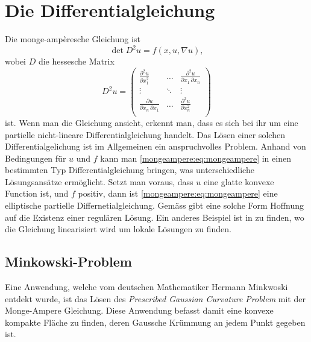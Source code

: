 %
%
%
%
\section{Die Differentialgleichung\label{mongeampere:section:teil0}}
Die monge-ampèresche Gleichung ist
\begin{equation}
  \det D^2 u = f(x, u, \nabla u),
  \label{mongeampere:eq:mongeampere}
\end{equation}
wobei $D$ die hessesche Matrix
\begin{equation}
  D^2 u =
  \begin{pmatrix}
    \frac{\partial^2 u}{\partial x_1^2} & \dots &\frac{\partial^2 u}{\partial x_1 \,\partial x_n} \\
  \vdots & \ddots & \vdots \\
  \frac{\partial u}{\partial x_n \,\partial x_1} & \dots &\frac{\partial^2 u}{\partial x_n^2} \\
  \end{pmatrix}
  \label{mongeampere:eq:hess}
\end{equation}
ist.
Wenn man die Gleichung ansieht, erkennt man, dass es sich bei ihr um eine partielle
nicht-lineare Differentialgleichung handelt.
Das Lösen einer solchen Differentialgelichung ist im Allgemeinen ein anspruchvolles Problem.
Anhand von Bedingungen für $u$ und $f$ kann man \eqref{mongeampere:eq:mongeampere} 
in einen bestimmten Typ Differentialgleichung bringen, was unterschiedliche Lösungsansätze ermöglicht.
Setzt man voraus, dass $u$ eine glatte konvexe Function ist, und $f$ positiv, dann ist \eqref{mongeampere:eq:mongeampere}
eine elliptische partielle Differnetialgleichung.
Gemäss \cite{mongeampere:figalli2018mongeampereequation} gibt eine solche Form Hoffnung auf die Existenz einer regulären Lösung.
Ein anderes Beispiel ist in \cite{mongeampere:figalli2022prescribednegativegausscurvature} zu finden, wo die 
Gleichung linearisiert wird um lokale Lösungen zu finden.

\subsection{Minkowski-Problem}
Eine Anwendung, welche vom deutschen Mathematiker Hermann Minkwoski entdekt wurde, ist das Lösen des
\emph{Prescribed Gaussian Curvature Problem} mit der Monge-Ampere Gleichung.
Diese Anwendung befasst damit eine konvexe kompakte Fläche zu finden, deren Gaussche Krümmung 
an jedem Punkt gegeben ist.

